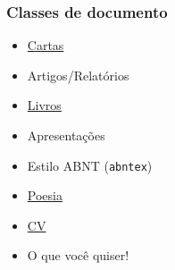 \documentclass{beamer}
\begin{document}
\begin{frame}
   \frametitle{Classes de documento}
   \begin{itemize}
      \item \href{exemplos_latex/exemplo_carta.pdf}{Cartas}
      \item Artigos/Relatórios
      \item \href{/home/melissa/Dropbox/Documentos/latex/beameruserguide.pdf}{Livros}
      \item Apresentações
      \item Estilo ABNT ({\tt{abntex}})
      \item \href{extra_files/ornament.pdf}{Poesia}
      \item \href{exemplos_latex/cv.pdf}{CV}
      \item \alert{O que você quiser!}
   \end{itemize}
\end{frame}
\end{document}
